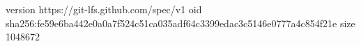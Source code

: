 version https://git-lfs.github.com/spec/v1
oid sha256:fe59e6ba442e0a0a7f524c51ca035adf64c3399edac3c5146e0777a4c854f21e
size 1048672
